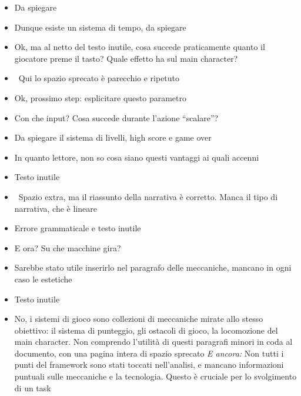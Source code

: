{\begin{itemize}
  \item {} Da spiegare
  \item {} Dunque esiste un sistema di tempo, da spiegare
  \item {} Ok, ma al netto del testo inutile, cosa succede praticamente quanto il giocatore preme il tasto? Quale effetto ha sul main character?
  \item \rvVuoto\ Qui lo spazio sprecato è parecchio e ripetuto
  \item {} Ok, prossimo step: esplicitare questo parametro
  \item {} Con che input? Cosa succede durante l'azione ``scalare''?
  \item {} Da spiegare il sistema di livelli, high score e game over
  \item {} In quanto lettore, non so cosa siano questi vantaggi ai quali accenni
  \item {} Testo inutile
  \item \rvVuoto\ Spazio extra, ma il riassunto della narrativa è corretto. Manca il tipo di narrativa, che è lineare
  \item {} Errore grammaticale e testo inutile
  \item {} E ora? Su che macchine gira?
  \item {} Sarebbe stato utile inserirlo nel paragrafo delle meccaniche, mancano in ogni caso le estetiche
  \item {} Testo inutile
  \item {} No, i sistemi di gioco sono collezioni di meccaniche mirate allo stesso obiettivo: il sistema di punteggio, gli ostacoli di gioco, la locomozione del main character. Non comprendo l'utilità di questi paragrafi minori in coda al documento, con una pagina intera di spazio sprecato \emph{E ancora:} Non tutti i punti del framework sono stati toccati nell'analisi, e mancano informazioni puntuali sulle meccaniche e la tecnologia. Questo è cruciale per lo svolgimento di un task
\end{itemize}
}

